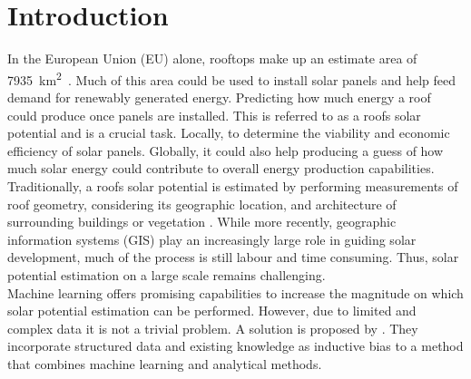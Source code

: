 \documentclass{article} %
\begin{document}
\section*{Introduction}
In the European Union (EU) alone, rooftops make up an estimate area of \SI{7935}{\kilo\metre\squared}~\cite{bodis2019high}. Much of this area could be used to install solar panels and help feed demand for renewably generated energy. Predicting how much energy a roof could produce once panels are installed. This is referred to as a roofs solar potential and is a crucial task. Locally, to determine the viability and economic efficiency of solar panels. Globally, it could also help producing a guess of how much solar energy could contribute to overall energy production capabilities.\\
Traditionally, a roofs solar potential is estimated by performing measurements of roof geometry, considering its geographic location, and architecture of surrounding buildings or vegetation \cite{freitas2015modelling}. While more recently, geographic information systems (GIS) play an increasingly large role in guiding solar development, much of the process is still labour and time consuming. Thus, solar potential estimation on a large scale remains challenging.\\
Machine learning offers promising capabilities to increase the magnitude on which solar potential estimation can be performed. However, due to limited and complex data it is not a trivial problem. A solution is proposed by \citet{de2021predicting}. They incorporate structured data and existing knowledge as inductive bias to a method that combines machine learning and analytical methods.
\end{document}
